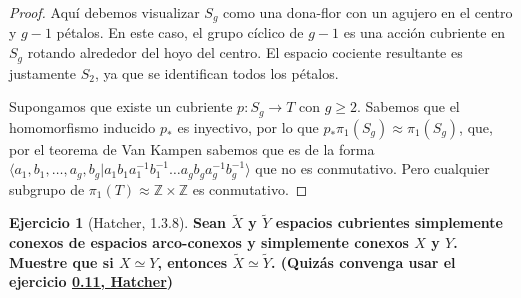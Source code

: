 \documentclass[spanish]{book}
\theoremstyle{definition}
\newtheorem*{ejer}{Ejercicio}
\newcommand{\Z}{\mathbb{Z}}
\begin{document}
\begin{proof}
	Aquí debemos visualizar $S_g$ como una dona-flor con un agujero en el centro y $g-1$ pétalos. En este caso, el grupo cíclico de $g-1$ es una acción cubriente en $S_{g}$ rotando alrededor del hoyo del centro. El espacio cociente resultante es justamente $S_2$, ya que se identifican todos los pétalos.
	
	Supongamos que existe un cubriente $p:S_g\to T$ con $g\geq2$. Sabemos que el homomorfismo inducido $p_*$ es inyectivo, por lo que $p_*\pi_1(S_g)\approx\pi_1(S_g)$, que, por el teorema de Van Kampen sabemos que es de la forma $\langle a_1,b_1,\ldots,a_g,b_g|a_1b_1a_1^{-1}b_1^{-1}\ldots a_{g}b_ga_g^{-1}b_g^{-1}\rangle$ que no es conmutativo. Pero cualquier subgrupo de $\pi_1(T)\approx\Z\times\Z$ es conmutativo.
\end{proof}
\begin{ejer}[Hatcher, 1.3.8]
	\textbf{Sean $\tilde{X}$ y $\tilde{Y}$ espacios cubrientes simplemente conexos de espacios arco-conexos y simplemente conexos $X$ y $Y$. Muestre que si $X\simeq Y$, entonces $\tilde{X}\simeq\tilde{Y}$. (Quizás convenga usar el ejercicio \hyperref[hatcher:0.11]{0.11, Hatcher})}
\end{ejer}
\end{document}
